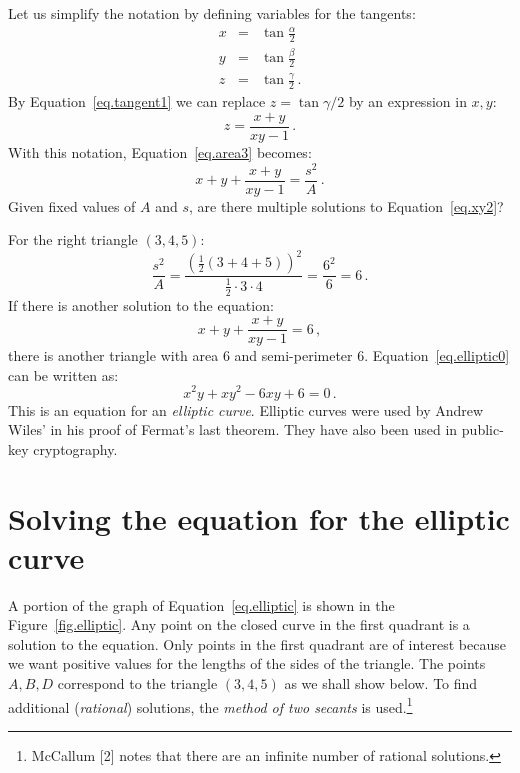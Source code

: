 Let us simplify the notation by defining variables for the tangents:
\begin{eqnarray*}
x&=&\tan \frac{\alpha}{2}\\
y&=&\tan \frac{\beta}{2}\\
z&=&\tan \frac{\gamma}{2}\,.
\end{eqnarray*}
By Equation~\ref{eq.tangent1} we can replace $z=\tan\gamma/2$ by an expression in $x,y$:
\begin{equation}
z = \frac{x+y}{xy-1}\,.\label{eq.xy1}
\end{equation}
With this notation, Equation~\ref{eq.area3} becomes:
\begin{equation}
x+y+\frac{x+y}{xy-1}=\frac{s^2}{A}\,.\label{eq.xy2}
\end{equation}
Given fixed values of $A$ and $s$, are there multiple solutions to Equation~\ref{eq.xy2}?

For the right triangle $(3,4,5)$:
\begin{equation}
\frac{s^2}{A} = \frac{\left(\frac{1}{2}(3+4+5)\right)^2}{\frac{1}{2}\cdot 3\cdot 4} = \frac{6^2}{6}=6\,.
\end{equation}
If there is another solution to the equation:
\begin{equation}
x+y+\frac{x+y}{xy-1}=6\,,\label{eq.elliptic0}
\end{equation}
there is another triangle with area $6$ and semi-perimeter $6$.
Equation~\ref{eq.elliptic0} can be written as:
\begin{equation}
x^2y + xy^2 -6xy + 6 = 0\,.\label{eq.elliptic}
\end{equation}
This is an equation for an \emph{elliptic curve}. Elliptic curves were used by Andrew Wiles' in his proof of Fermat's last theorem. They have also been used in public-key cryptography.

\section{Solving the equation for the elliptic curve}

A portion of the graph of Equation~\ref{eq.elliptic} is shown in the Figure~\ref{fig.elliptic}. Any point on the closed curve in the first quadrant is a solution to the equation. Only points in the first quadrant are of interest because we want positive values for the lengths of the sides of the triangle. The points $A,B,D$ correspond to the triangle $(3,4,5)$ as we shall show below. To find additional (\emph{rational}) solutions, the \emph{method of two secants} is used.\footnote{McCallum [2] notes that there are an infinite number of rational solutions.}

